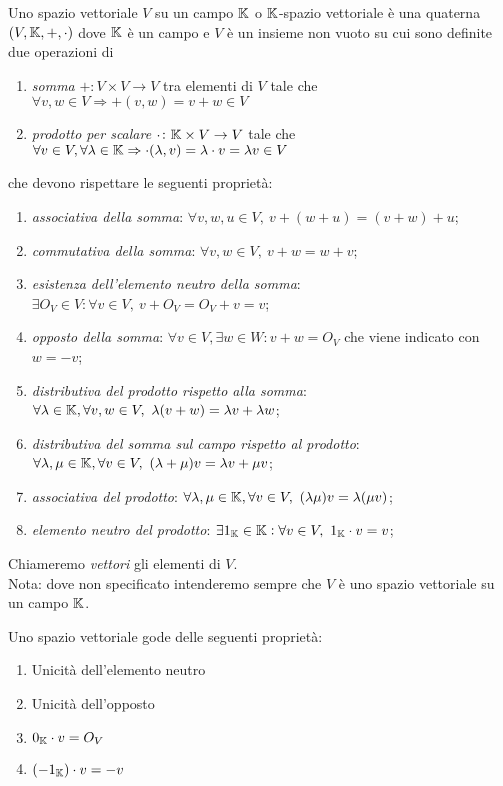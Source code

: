\begin{definition}
	Uno spazio vettoriale $ V $ su un campo $ \mathbb{K} $ o $ \mathbb{K} $-spazio vettoriale è una quaterna $ (V, \mathbb{K}, +, \cdot) $ dove $ \mathbb{K} $ è un campo e $ V $ è un insieme non vuoto su cui sono definite due operazioni di 
	\begin{enumerate}
		\item \emph{somma} $ + \colon V \times V \to V $ tra elementi di $ V $ tale che $ \forall v, w \in V \Rightarrow + (v, w) = v + w \in V $
		\item \emph{prodotto per scalare} $ \cdot \colon \mathbb{K} \times V \to V $ tale che $ \forall v \in V, \forall \lambda \in \mathbb{K} \Rightarrow \cdot (\lambda, v) = \lambda \cdot v = \lambda v \in V $
	\end{enumerate}
	che devono rispettare le seguenti proprietà:
	\begin{enumerate}[label=(\roman*)]
		\item \emph{associativa della somma}: $ \forall v, w, u \in V, \ v + (w + u) = (v + w) + u $;
		\item \emph{commutativa della somma}: $ \forall v, w \in V, \ v + w = w + v $;
		\item \emph{esistenza dell'elemento neutro della somma}: $ \exists O_{V} \in V : \forall v \in V, \ v + O_{V} = O_{V} + v = v $;
		\item \emph{opposto della somma}: $ \forall v \in V, \exists w \in W : v + w = O_{V} $ che viene indicato con $ w = -v $;
		\item \emph{distributiva del prodotto rispetto alla somma}: $ \forall \lambda \in \K, \forall v, w \in V, \ \lambda (v + w) = \lambda v + \lambda w $;
		\item \emph{distributiva del somma sul campo rispetto al prodotto}: $ \forall \lambda, \mu \in \mathbb{K}, \forall v \in V, \ (\lambda + \mu) v = \lambda v + \mu v $;
		\item \emph{associativa del prodotto}: $ \forall \lambda, \mu \in \K, \forall v \in V, \ (\lambda \mu) v = \lambda (\mu v) $;
		\item \emph{elemento neutro del prodotto}: $ \exists 1_{\mathbb{K}} \in \mathbb{K} : \forall v \in V, \ 1_{\mathbb{K}} \cdot v = v $;
	\end{enumerate}
	Chiameremo \emph{vettori} gli elementi di $ V $. \\
	\textsf{Nota: dove non specificato intenderemo sempre che $ V $ è uno spazio vettoriale su un campo $ \mathbb{K} $.}
\end{definition}

\begin{propriety} Uno spazio vettoriale gode delle seguenti proprietà:
	\begin{enumerate}
		\item Unicità dell'elemento neutro
		\item Unicità dell'opposto
		\item $ 0_{\mathbb{K}} \cdot v = O_V $
		\item $ (-1_{\mathbb{K}}) \cdot v = -v $
	\end{enumerate}
\end{propriety}

